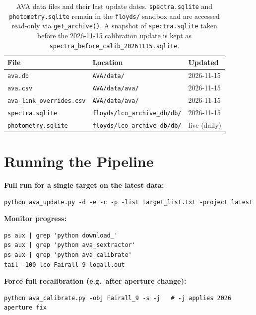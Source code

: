 \documentclass[12pt,a4paper]{article}
\begin{document}
\begin{table}[h!]
\centering
\small
\begin{tabular}{lll}
\toprule
File & Location & Updated \\
\midrule
\texttt{ava.db}                 & \texttt{AVA/data/} & 2026-11-15 \\
\texttt{ava.csv}                & \texttt{AVA/data/ava/} & 2026-11-15 \\
\texttt{ava\_link\_overrides.csv} & \texttt{AVA/data/ava/} & 2026-11-15 \\
\texttt{spectra.sqlite}         & \texttt{floyds/lco\_archive\_db/db/} & 2026-11-15 \\
\texttt{photometry.sqlite}      & \texttt{floyds/lco\_archive\_db/db/} & live (daily) \\
\bottomrule
\end{tabular}
\caption{AVA data files and their last update dates.  \texttt{spectra.sqlite}
  and \texttt{photometry.sqlite} remain in the \texttt{floyds/} sandbox and
  are accessed read-only via \texttt{get\_archive()}.  A snapshot of
  \texttt{spectra.sqlite} taken before the 2026-11-15 calibration update is
  kept as \texttt{spectra\_before\_calib\_20261115.sqlite}.}
\end{table}


\appendix
\section{Running the Pipeline}
\label{app:run}

\textbf{Full run for a single target on the latest data:}
\begin{lstlisting}[style=shell]
python ava_update.py -d -e -c -p -list target_list.txt -project latest
\end{lstlisting}

\textbf{Monitor progress:}
\begin{lstlisting}[style=shell]
ps aux | grep 'python download_'
ps aux | grep 'python ava_sextractor'
ps aux | grep 'python ava_calibrate'
tail -100 lco_Fairall_9_logall.out
\end{lstlisting}

\textbf{Force full recalibration (e.g.\ after aperture change):}
\begin{lstlisting}[style=shell]
python ava_calibrate.py -obj Fairall_9 -s -j   # -j applies 2026 aperture fix
\end{lstlisting}
\end{document}
